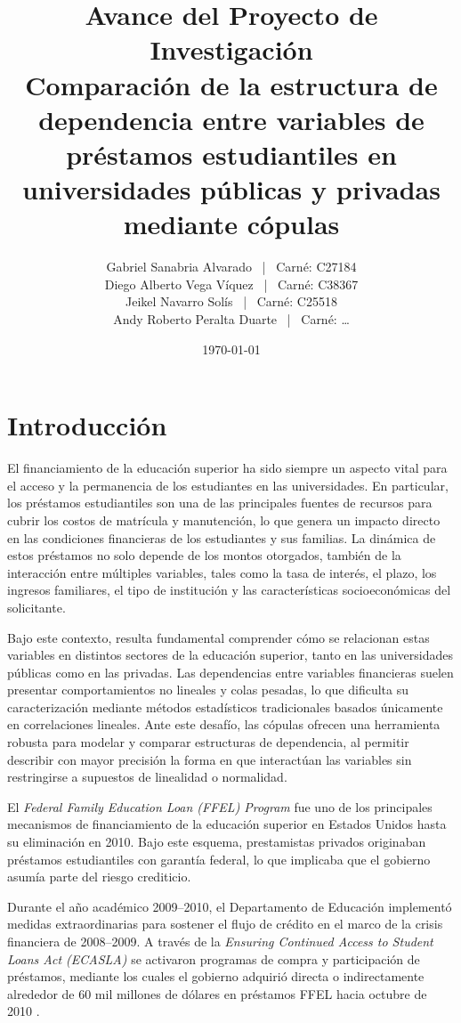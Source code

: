 \documentclass[11pt,a4paper]{article}
\title{Avance del Proyecto de Investigación \\[0.2cm]
\large Comparación de la estructura de dependencia entre variables de préstamos estudiantiles en universidades públicas y privadas mediante cópulas}
\author{
Gabriel Sanabria Alvarado \, | \, Carné: C27184 \\
Diego Alberto Vega Víquez \, | \, Carné: C38367 \\
Jeikel Navarro Solís \, | \, Carné: C25518 \\
Andy Roberto Peralta Duarte \, | \, Carné: \dots
}
\date{\today}
\begin{document}
\maketitle

\section{Introducción}

El financiamiento de la educación superior ha sido siempre un aspecto vital para el acceso y la permanencia de los estudiantes en las universidades. En particular, los préstamos estudiantiles son una de las principales fuentes de recursos para cubrir los costos de matrícula y manutención, lo que genera un impacto directo en las condiciones financieras de los estudiantes y sus familias. La dinámica de estos préstamos no solo depende de los montos otorgados, también de la interacción entre múltiples variables, tales como la tasa de interés, el plazo, los ingresos familiares, el tipo de institución y las características socioeconómicas del solicitante.

Bajo este contexto, resulta fundamental comprender cómo se relacionan estas variables en distintos sectores de la educación superior, tanto en las universidades públicas como en las privadas. Las dependencias entre variables financieras suelen presentar comportamientos no lineales y colas pesadas, lo que dificulta su caracterización mediante métodos estadísticos tradicionales basados únicamente en correlaciones lineales. Ante este desafío, las cópulas ofrecen una herramienta robusta para modelar y comparar estructuras de dependencia, al permitir describir con mayor precisión la forma en que interactúan las variables sin restringirse a supuestos de linealidad o normalidad.

El \textit{Federal Family Education Loan (FFEL) Program} fue uno de los principales mecanismos de financiamiento de la educación superior en Estados Unidos hasta su eliminación en 2010. Bajo este esquema, prestamistas privados originaban préstamos estudiantiles con garantía federal, lo que implicaba que el gobierno asumía parte del riesgo crediticio.

Durante el año académico 2009--2010, el Departamento de Educación implementó medidas extraordinarias para sostener el flujo de crédito en el marco de la crisis financiera de 2008--2009. A través de la \textit{Ensuring Continued Access to Student Loans Act (ECASLA)} se activaron programas de compra y participación de préstamos, mediante los cuales el gobierno adquirió directa o indirectamente alrededor de 60 mil millones de dólares en préstamos FFEL hacia octubre de 2010 \parencite{usdoe2010}.
\end{document}

